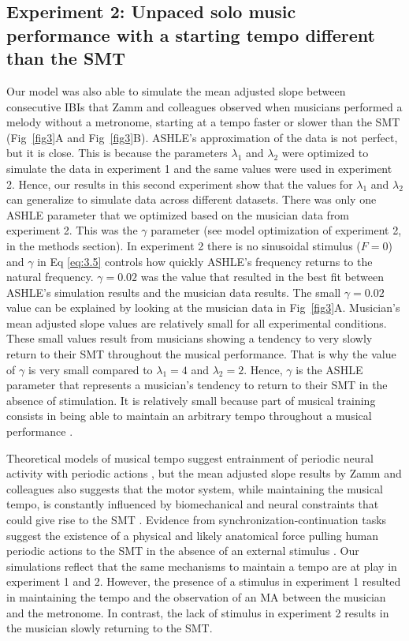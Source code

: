 \documentclass[10pt,letterpaper]{article}
\begin{document}
\subsection*{Experiment 2: Unpaced solo music performance with a starting tempo different than the SMT}

Our model was also able to simulate the mean adjusted slope between consecutive IBIs that Zamm and colleagues \cite{zamm2018musicians} observed when musicians performed a melody without a metronome, starting at a tempo faster or slower than the SMT (Fig~\ref{fig3}A and Fig~\ref{fig3}B). ASHLE's approximation of the data is not perfect, but it is close. This is because the parameters $\lambda_1$ and $\lambda_2$ were optimized to simulate the data in experiment 1 and the same values were used in experiment 2. Hence, our results in this second experiment show that the values for $\lambda_1$ and $\lambda_2$ can generalize to simulate data across different datasets. There was only one ASHLE parameter that we optimized based on the musician data from experiment 2. This was the $\gamma$ parameter (see model optimization of experiment 2, in the methods section). In experiment 2 there is no sinusoidal stimulus ($F=0$) and $\gamma$ in Eq \eqref{eq:3.5} controls how quickly ASHLE's frequency returns to the natural frequency. $\gamma = 0.02$ was the value that resulted in the best fit between ASHLE's simulation results and the musician data results. The small $\gamma=0.02$ value can be explained by looking at the musician data in Fig~\ref{fig3}A. Musician's mean adjusted slope values are relatively small for all experimental conditions. These small values result from musicians showing a tendency to very slowly return to their SMT throughout the musical performance. That is why the value of $\gamma$ is very small compared to $\lambda_1=4$ and $\lambda_2=2$. Hence, $\gamma$ is the ASHLE parameter that represents a musician's tendency to return to their SMT in the absence of stimulation. It is relatively small because part of musical training consists in being able to maintain an arbitrary tempo throughout a musical performance \cite{fine2009memory, schultz2019roles}.

Theoretical models of musical tempo suggest entrainment of periodic neural activity with periodic actions \cite{large1999dynamics}, but the mean adjusted slope results by Zamm and colleagues \cite{zamm2018musicians} also suggests that the motor system, while maintaining the musical tempo, is constantly influenced by biomechanical and neural constraints that could give rise to the SMT \cite{goodman2000advantages}. Evidence from synchronization-continuation tasks suggest the existence of a physical and likely anatomical force pulling human periodic actions to the SMT in the absence of an external stimulus \cite{yu2003task, mcauley2006time}. Our simulations reflect that the same mechanisms to maintain a tempo are at play in experiment 1 and 2. However, the presence of a stimulus in experiment 1 resulted in maintaining the tempo and the observation of an MA between the musician and the metronome. In contrast, the lack of stimulus in experiment 2 results in the musician slowly returning to the SMT.
\end{document}
